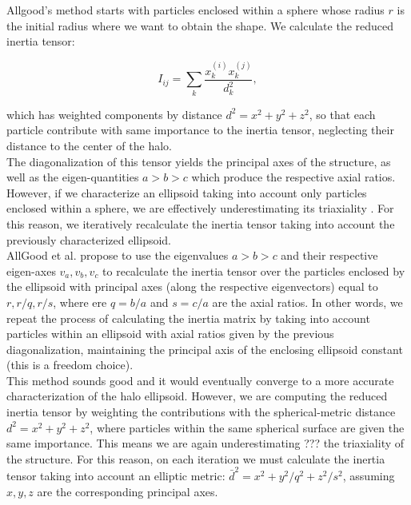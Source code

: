 Allgood's method starts with particles enclosed within a sphere whose radius $r$ is the initial radius where we want to obtain the shape. We calculate the reduced inertia tensor:

\begin{equation}
I_{ij} = \sum_k \frac{x_k^{(i)}x_k^{(j)}}{d^2_k},
\label{eq:inertia}
\end{equation}

which has weighted components by distance $d^2=x^2+y^2+z^2$, so that each particle contribute with same importance to the inertia tensor, neglecting their distance to the center of the halo.\\

The diagonalization of this tensor yields the principal axes of the structure, as well as the eigen-quantities $a>b>c$ which produce the respective axial ratios. However, if we characterize an ellipsoid taking into account only particles enclosed within a sphere, we are effectively underestimating its triaxiality \cite{AllGood}. For this reason, we iteratively recalculate the inertia tensor taking into account the previously characterized ellipsoid.\\

AllGood et al. propose to use the eigenvalues $a>b>c$ and their respective eigen-axes $v_a,v_b,v_c$ to recalculate the inertia tensor over the particles enclosed by the ellipsoid with principal axes (along the respective eigenvectors) equal to $r,r/q,r/s$, where ere $q = b/a$ and $s=c/a$ are the axial ratios. In other words, we repeat the process of calculating the inertia matrix by taking into account particles within an ellipsoid with axial ratios given by the previous diagonalization, maintaining the principal axis of the enclosing ellipsoid constant (this is a freedom choice).\\

This method sounds good and it would eventually converge to a more accurate characterization of the halo ellipsoid. However, we are computing the reduced inertia tensor by weighting the contributions with the spherical-metric distance $d^2=x^2+y^2+z^2$, where particles within the same spherical surface are given the same importance. This means we are again underestimating ??? the triaxiality of the structure. For this reason, on each iteration we must calculate the inertia tensor taking into account an elliptic metric: $\bar{d}^2 = x^2+y^2/q^2+z^2/s^2$, assuming $x,y,z$ are the corresponding principal axes.\\

